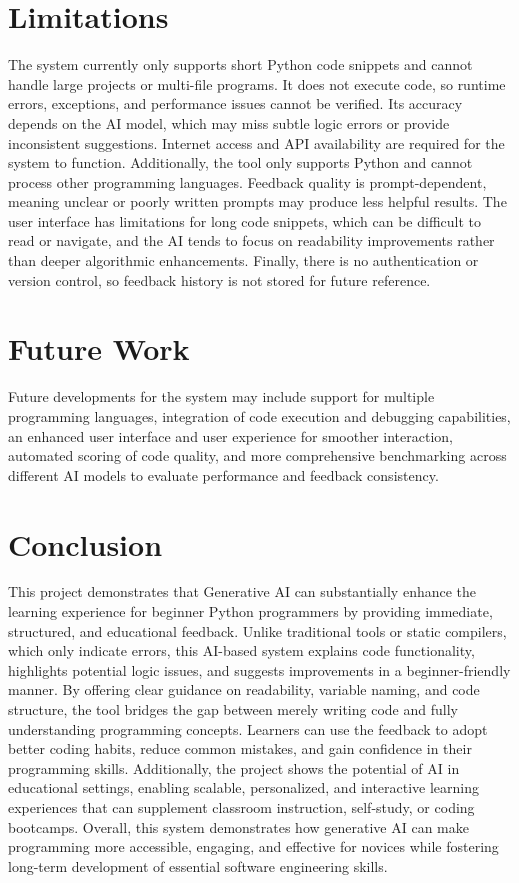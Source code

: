\documentclass[12pt]{article}
\begin{document}
\section*{Limitations}

The system currently only supports short Python code snippets and cannot handle large projects or multi-file programs. It does not execute code, so runtime errors, exceptions, and performance issues cannot be verified. Its accuracy depends on the AI model, which may miss subtle logic errors or provide inconsistent suggestions. Internet access and API availability are required for the system to function. Additionally, the tool only supports Python and cannot process other programming languages. Feedback quality is prompt-dependent, meaning unclear or poorly written prompts may produce less helpful results. The user interface has limitations for long code snippets, which can be difficult to read or navigate, and the AI tends to focus on readability improvements rather than deeper algorithmic enhancements. Finally, there is no authentication or version control, so feedback history is not stored for future reference.

\section*{Future Work}

Future developments for the system may include support for multiple programming languages, integration of code execution and debugging capabilities, an enhanced user interface and user experience for smoother interaction, automated scoring of code quality, and more comprehensive benchmarking across different AI models to evaluate performance and feedback consistency.

\section*{Conclusion}

This project demonstrates that Generative AI can substantially enhance the learning experience for beginner Python programmers by providing immediate, structured, and educational feedback. Unlike traditional tools or static compilers, which only indicate errors, this AI-based system explains code functionality, highlights potential logic issues, and suggests improvements in a beginner-friendly manner. By offering clear guidance on readability, variable naming, and code structure, the tool bridges the gap between merely writing code and fully understanding programming concepts. Learners can use the feedback to adopt better coding habits, reduce common mistakes, and gain confidence in their programming skills. Additionally, the project shows the potential of AI in educational settings, enabling scalable, personalized, and interactive learning experiences that can supplement classroom instruction, self-study, or coding bootcamps. Overall, this system demonstrates how generative AI can make programming more accessible, engaging, and effective for novices while fostering long-term development of essential software engineering skills.
\end{document}
